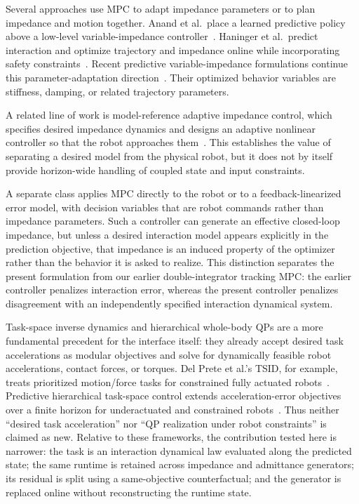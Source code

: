 \documentclass[journal]{IEEEtran}
\begin{document}
Several approaches use MPC to adapt impedance parameters or to plan
impedance and motion together. Anand et al.\ place a learned predictive
policy above a low-level variable-impedance controller~\cite{ref1}.
Haninger et al.\ predict interaction and optimize trajectory and
impedance online while incorporating safety constraints~\cite{ref2}.
Recent predictive variable-impedance formulations continue this
parameter-adaptation direction~\cite{ref3}. Their optimized behavior
variables are stiffness, damping, or related trajectory parameters.

A related line of work is model-reference adaptive impedance control,
which specifies desired impedance dynamics and designs an adaptive
nonlinear controller so that the robot approaches them~\cite{ref4}. This
establishes the value of separating a desired model from the physical
robot, but it does not by itself provide horizon-wide handling of coupled
state and input constraints.

A separate class applies MPC directly to the robot or to a
feedback-linearized error model, with decision variables that are robot
commands rather than impedance parameters. Such a controller can generate
an effective closed-loop impedance, but unless a desired interaction
model appears explicitly in the prediction objective, that impedance is
an induced property of the optimizer rather than the behavior it is
asked to realize. This distinction separates the present formulation
from our earlier double-integrator tracking MPC: the earlier controller
penalizes interaction error, whereas the present controller penalizes
disagreement with an independently specified interaction dynamical
system.

Task-space inverse dynamics and hierarchical whole-body QPs are a more
fundamental precedent for the interface itself: they already accept desired
task accelerations as modular objectives and solve for dynamically feasible
robot accelerations, contact forces, or torques. Del Prete et al.'s TSID, for
example, treats prioritized motion/force tasks for constrained fully actuated
robots~\cite{ref19}. Predictive hierarchical task-space control extends
acceleration-error objectives over a finite horizon for underactuated and
constrained robots~\cite{ref20}. Thus neither ``desired task acceleration''
nor ``QP realization under robot constraints'' is claimed as new. Relative
to these frameworks, the contribution tested here is narrower: the task is
an interaction dynamical law evaluated along the predicted state; the same
runtime is retained across impedance and admittance generators; its residual
is split using a same-objective counterfactual; and the generator is replaced
online without reconstructing the runtime state.
\end{document}
